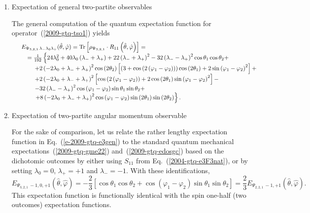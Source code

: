 \documentclass[pra,amsfonts,showpacs,showkeys,preprint]{revtex4}
\begin{document}
\begin{enumerate}

\item{Expectation of general two-partite observables}

The  general computation of the quantum expectation function for operator~(\ref{2009-gtq-tso1})
yields
\begin{equation}
\begin{array}{ll}
&E_{{ \Psi_{3,2,1}}\,\lambda_- \lambda_0 \lambda_+ } ({\hat \theta},{\hat \varphi} )= {\rm Tr}\left[\rho_{ \Psi_{3,2,1}} \cdot R_{1 1} \left({\hat \theta},{\hat \varphi} \right)\right] =\\
& \quad   =  \frac{1}{192} \left\{24 \lambda_0^2 + 40 \lambda_0 \left(\lambda_- + \lambda_+\right) + 22 \left(\lambda_- + \lambda_+\right)^2 -
   32 \left(\lambda_- - \lambda_+\right)^2 \cos \theta_1  \cos \theta_2  +   \right.                                                                                     \\
& \qquad \; + 2 \left(-2 \lambda_0 + \lambda_- + \lambda_+\right)^2 \cos\left(2  \theta_2 \right) \left[\left(3 + \cos\left(2 \left( \varphi_1  -
  \varphi_2 \right)\right)\right) \cos\left(2  \theta_1 \right) + 2 \sin\left( \varphi_1  -  \varphi_2 \right)^2\right] +                                          \\
& \qquad \; +  2 \left(-2 \lambda_0 + \lambda_- + \lambda_+\right)^2 \left[\cos\left(2 \left( \varphi_1  -  \varphi_2 \right)\right) +
     2 \cos\left(2  \theta_1 \right) \sin\left( \varphi_1  -  \varphi_2 \right)^2\right] -                                                                         \\
& \qquad \; -32 \left(\lambda_- - \lambda_+\right)^2 \cos\left( \varphi_1  -  \varphi_2 \right) \sin \theta_1  \sin \theta_2  +    \\
& \qquad \; \left.   + 8 \left(-2 \lambda_0 + \lambda_- + \lambda_+\right)^2 \cos\left( \varphi_1  -  \varphi_2 \right) \sin\left(2  \theta_1 \right) \sin\left(2  \theta_2 \right)\right\}
.
\end{array}
\label{e-2009-gtq-e3gen}
\end{equation}

\item{Expectation of two-partite angular momentum observable}

For the sake of comparison, let us relate the rather lengthy
expectation function in Eq.~(\ref{e-2009-gtq-e3gen})
to the standard  quantum mechanical expectations~(\ref{2009-gtq-gme22})
and~(\ref{2009-gtq-edosgc}) based on the dichotomic outcomes
by either using $ S_{1 1 }$ from Eq.~(\ref{2004-gtq-e3F3nat}),
or by setting $\lambda_0 = 0$, $  \lambda_+ = +1$ and  $\lambda_- =-1$.
With these identifications,
\begin{equation}
E_{{ \Psi_{3,2,1}}\,-1, 0, +1 } ({\hat \theta},{\hat \varphi} )= -\frac{2}{3}
\left[\cos \theta_1 \cos \theta_2 + \cos (\varphi_1 - \varphi_2) \sin \theta_1 \sin \theta_2\right]
= \frac{2}{3}E_{{ \Psi_{2,2,1}}\,-1, +1 } ({\hat \theta},{\hat \varphi} )
\label{2009-gtq-edosgc3}
.
\end{equation}
This expectation function is functionally identical with the spin one-half (two outcomes) expectation functions.


\end{enumerate}
\end{document}
